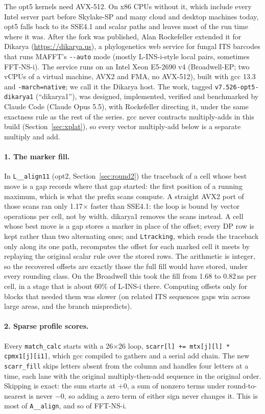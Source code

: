 \documentclass[11pt]{article}
\newcommand{\code}[1]{\texttt{#1}}
\begin{document}
The opt5 kernels need AVX-512. On x86 CPUs without it, which include every Intel server part
before Skylake-SP and many cloud and desktop machines today, opt5 falls back to its SSE4.1
and scalar paths and leaves most of the run time where it was. After the fork was published,
Alan Rockefeller extended it for Dikarya (\url{https://dikarya.us}), a phylogenetics web
service for fungal ITS barcodes that runs MAFFT's \code{-{}-auto} mode (mostly L-INS-i-style
local pairs, sometimes FFT-NS-i). The service runs on an Intel Xeon E5-2690 v4 (Broadwell-EP;
two vCPUs of a virtual machine, AVX2 and FMA, no AVX-512), built with gcc 13.3 and
\code{-march=native}; we call it the Dikarya host. The work, tagged \code{v7.526-opt5-dikarya1}
(``dikarya1''), was designed, implemented, verified and benchmarked by Claude Code (Claude
Opus 5.5), with Rockefeller directing it, under the same exactness rule as the rest of
the series. gcc never contracts multiply-adds in this build (Section~\ref{sec:xplat}), so
every vector multiply-add below is a separate multiply and add.

\paragraph{1. The marker fill.} In \code{L\_\_align11} (opt2, Section~\ref{sec:round2}) the
traceback of a cell whose best move is a gap records where that gap started: the first
position of a running maximum, which is what the prefix scans compute. A straight AVX2 port of
those scans ran only 1.17$\times$ faster than SSE4.1: the loop is bound by vector operations
per cell, not by width. dikarya1 removes the scans instead. A cell whose best move is a gap
stores a marker in place of the offset; every DP row is kept rather than two alternating
ones; and \code{Ltracking}, which reads the traceback only along its one path, recomputes the
offset for each marked cell it meets by replaying the original scalar rule over the stored
rows. The arithmetic is integer, so the recovered offsets are exactly those the full fill
would have stored, under every rounding class. On the Broadwell this took the fill from 1.68
to 0.82\,ns per cell, in a stage that is about 60\% of L-INS-i there. Computing offsets only
for blocks that needed them was slower (on related ITS sequences gaps win across large
areas, and the branch mispredicts).

\paragraph{2. Sparse profile scores.} Every \code{match\_calc} starts with a 26$\times$26
loop, \code{scarr[l] += mtx[j][l] * cpmx1[j][i1]}, which gcc compiled to gathers and a serial
add chain. The new \code{scarr\_fill} skips letters absent from the column and handles four
letters at a time, each lane with the original multiply-then-add sequence in the original
order. Skipping is exact: the sum starts at $+0$, a sum of nonzero terms under
round-to-nearest is never $-0$, so adding a zero term of either sign never changes it. This
is most of \code{A\_\_align}, and so of FFT-NS-i.
\end{document}

